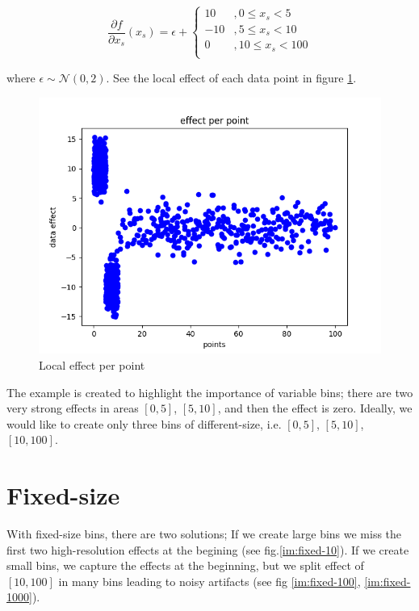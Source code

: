 \documentclass{article}
\begin{document}
\begin{equation} \label{eq:data-effect}
  \frac{\partial f}{ \partial x_s} (x_s) = \epsilon +
  \begin{cases}
    10 &,  0 \leq x_s < 5 \\
    -10 &, 5 \leq x_s < 10 \\
    0 &, 10 \leq x_s < 100 \\
  \end{cases}
\end{equation}

where \(\epsilon \sim \mathcal{N}(0, 2)\). See the local effect of
each data point in figure \ref{im:2}.


\begin{figure}[!h]\label{im:2}
\centering
\includegraphics[width=0.7\linewidth]{Figure_2.png}
\caption{Local effect per point}
\end{figure}

The example is created to highlight the importance of variable bins;
there are two very strong effects in areas \([0,5]\), \([5,10]\), and
then the effect is zero. Ideally, we would like to create only three
bins of different-size, i.e. \([0,5]\), \([5,10]\), \([10,100]\).


\section{Fixed-size}

With fixed-size bins, there are two solutions; If we create large bins
we miss the first two high-resolution effects at the begining (see
fig.\ref{im:fixed-10}). If we create small bins, we capture the
effects at the beginning, but we split effect of \([10,100]\) in many
bins leading to noisy artifacts (see fig \ref{im:fixed-100},
\ref{im:fixed-1000}).
\end{document}
